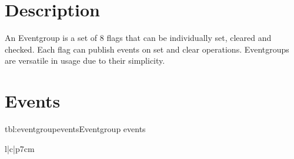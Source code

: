 \section{Description}

An Eventgroup is a set of 8 flags that can be individually set, cleared and checked. Each flag can publish events on set and clear operations. Eventgroups are versatile in usage due to their simplicity. 

\section{Events}

\begin{pdtable}{tbl:eventgroupevents}{Eventgroup events}
	\begin{pdtabular}{l|c|p{7cm}}
	\end{pdtabular}
\end{pdtable}
